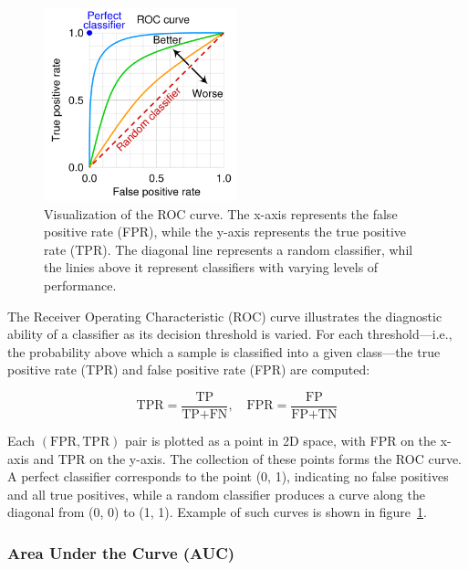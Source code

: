 \documentclass{pracalicmgr}
\begin{document}
\begin{figure}[H]
    \centering
    \includegraphics[width=0.5\textwidth]{src/roc-curveUp.jpg}
    \caption{Visualization of the ROC curve. The x-axis represents the false positive rate (FPR), while the y-axis represents the true positive rate (TPR). The diagonal line represents a random classifier, whil the linies above it represent classifiers with varying levels of performance\cite{ROCEG}.}
    \label{fig:roc_curve}
\end{figure}

The Receiver Operating Characteristic (ROC) curve illustrates the diagnostic ability of a classifier as its decision threshold is varied\cite{GoogleDevelopersROCAUC}. For each threshold—i.e., the probability above which a sample is classified into a given class—the true positive rate (TPR) and false positive rate (FPR) are computed:

\[
\text{TPR} = \frac{\text{TP}}{\text{TP} + \text{FN}}, \quad
\text{FPR} = \frac{\text{FP}}{\text{FP} + \text{TN}}
\]

Each \((\text{FPR}, \text{TPR})\) pair is plotted as a point in 2D space, with FPR on the x-axis and TPR on the y-axis. The collection of these points forms the ROC curve. A perfect classifier corresponds to the point (0, 1), indicating no false positives and all true positives, while a random classifier produces a curve along the diagonal from (0, 0) to (1, 1). Example of such curves is shown in figure~\ref{fig:roc_curve}.


\subsubsection{Area Under the Curve (AUC)}
\end{document}
